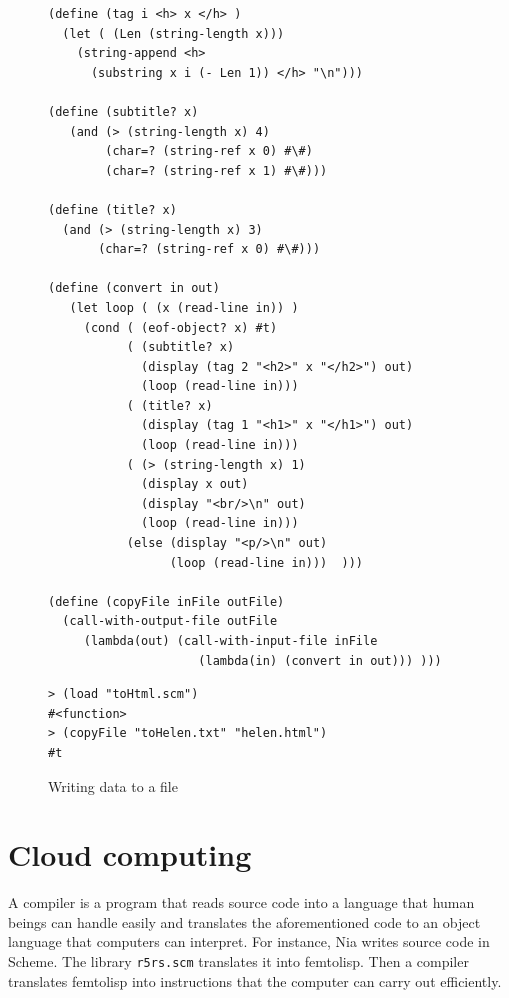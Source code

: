 \documentclass[a4paper,12pt]{book}
\newenvironment{fmpage}[1]
               {\begin{lrbox}{\fmbox}\begin{minipage}{#1}}
               {\end{minipage}\end{lrbox}\fbox{\usebox{\fmbox}}}
\begin{document}
\begin{figure}[!h]
\begin{fmpage}{\linewidth}
\begin{verbatim}
(define (tag i <h> x </h> )
  (let ( (Len (string-length x)))
    (string-append <h>
      (substring x i (- Len 1)) </h> "\n")))

(define (subtitle? x)
   (and (> (string-length x) 4)
        (char=? (string-ref x 0) #\#)
        (char=? (string-ref x 1) #\#)))

(define (title? x)
  (and (> (string-length x) 3)
       (char=? (string-ref x 0) #\#)))

(define (convert in out)
   (let loop ( (x (read-line in)) )
     (cond ( (eof-object? x) #t)
           ( (subtitle? x)
             (display (tag 2 "<h2>" x "</h2>") out)
             (loop (read-line in)))
           ( (title? x)
             (display (tag 1 "<h1>" x "</h1>") out)
             (loop (read-line in)))
           ( (> (string-length x) 1)
             (display x out)
             (display "<br/>\n" out)
             (loop (read-line in)))
           (else (display "<p/>\n" out)
                 (loop (read-line in)))  )))

(define (copyFile inFile outFile)
  (call-with-output-file outFile
     (lambda(out) (call-with-input-file inFile
                     (lambda(in) (convert in out))) )))
\end{verbatim}
\end{fmpage}

\begin{fmpage}{\linewidth}
\begin{verbatim}
> (load "toHtml.scm")
#<function>
> (copyFile "toHelen.txt" "helen.html")
#t
\end{verbatim}
\end{fmpage}
\caption{Writing data to a file}
\label{wrtFile}
\end{figure}

\chapter{Cloud computing}\label{cloud-computing}
A compiler is a program that reads
source code into a language that
human beings can handle easily
and translates the aforementioned
code to an object language that
computers can interpret.
For instance, Nia writes source code
in   Scheme.
The library \verb|r5rs.scm| translates
it into femtolisp.
Then a compiler translates femtolisp
into instructions that the
computer can carry out efficiently.
\end{document}
